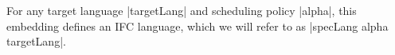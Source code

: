 
For any target language |targetLang| and scheduling policy |alpha|, this
embedding defines an IFC language, which we will
refer to as |specLang alpha targetLang|.
